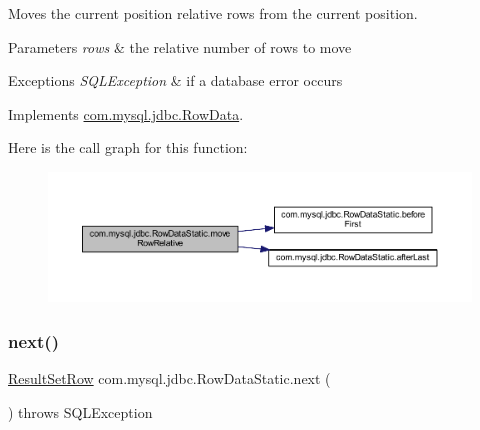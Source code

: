 Moves the current position relative \textquotesingle{}rows\textquotesingle{} from the current position.


\begin{DoxyParams}{Parameters}
{\em rows} & the relative number of rows to move \\
\hline
\end{DoxyParams}

\begin{DoxyExceptions}{Exceptions}
{\em S\+Q\+L\+Exception} & if a database error occurs \\
\hline
\end{DoxyExceptions}


Implements \mbox{\hyperlink{interfacecom_1_1mysql_1_1jdbc_1_1_row_data_ad0ef1f79fa19fbd533c4e1bfbabd7316}{com.\+mysql.\+jdbc.\+Row\+Data}}.

Here is the call graph for this function\+:
\nopagebreak
\begin{figure}[H]
\begin{center}
\leavevmode
\includegraphics[width=350pt]{classcom_1_1mysql_1_1jdbc_1_1_row_data_static_ae1af87ce2daba5af9430ee3eaa5086ac_cgraph}
\end{center}
\end{figure}
\mbox{\label{classcom_1_1mysql_1_1jdbc_1_1_row_data_static_ac220fe255287ae80ffb925828f4e4865}} 
\subsubsection{\texorpdfstring{next()}{next()}}
{\footnotesize\ttfamily \mbox{\hyperlink{classcom_1_1mysql_1_1jdbc_1_1_result_set_row}{Result\+Set\+Row}} com.\+mysql.\+jdbc.\+Row\+Data\+Static.\+next (\begin{DoxyParamCaption}{ }\end{DoxyParamCaption}) throws S\+Q\+L\+Exception}

